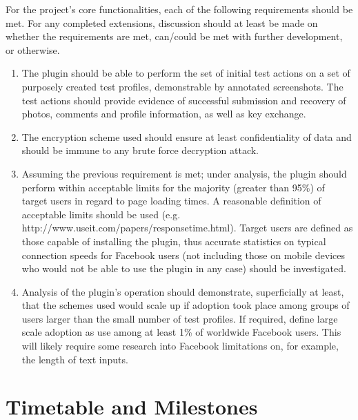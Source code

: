 \documentclass[12pt]{article}
\begin{document}
For the project's core functionalities, each of the following requirements should be met. For any completed extensions, discussion should at least be made on whether the requirements are met, can/could be met with further development, or otherwise.

\begin{enumerate}

\item The plugin should be able to perform the set of initial test actions on a set of purposely created test profiles, demonstrable by annotated screenshots. The test actions should provide evidence of successful submission and recovery of photos, comments and profile information, as well as key exchange.

\item The encryption scheme used should ensure at least confidentiality of data and should be immune to any brute force decryption attack.

\item Assuming the previous requirement is met; under analysis, the plugin should perform within acceptable limits for the majority (greater than 95\%) of target users in regard to page loading times. A reasonable definition of acceptable limits should be used (e.g. http://www.useit.com/papers/responsetime.html). Target users are defined as those capable of installing the plugin, thus accurate statistics on typical connection speeds for Facebook users (not including those on mobile devices who would not be able to use the plugin in any case) should be investigated.

\item Analysis of the plugin's operation should demonstrate, superficially at least, that the schemes used would scale up if adoption took place among groups of users larger than the small number of test profiles. If required, define large scale adoption as use among at least 1\% of worldwide Facebook users. This will likely require some research into Facebook limitations on, for example, the length of text inputs.


\end{enumerate}







\section*{Timetable and Milestones}
\end{document}
